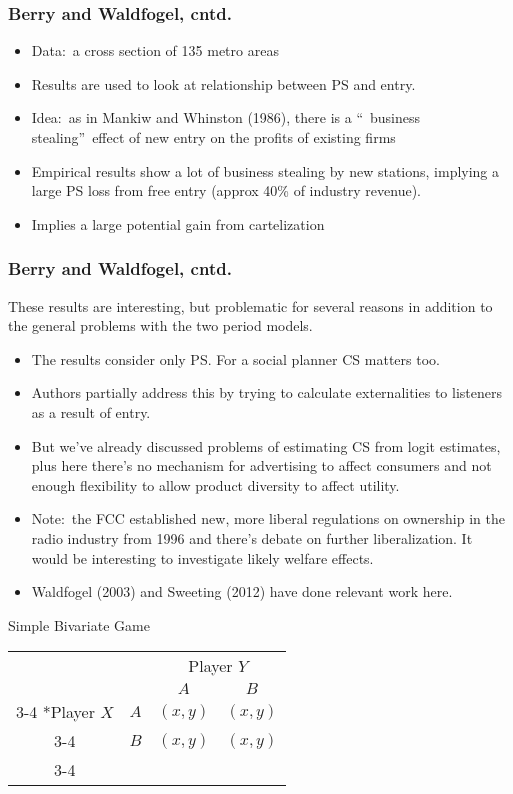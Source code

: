 \begin{frame}
\frametitle{Berry and Waldfogel, cntd.}
\begin{itemize}
\item Data:\ a cross section of 135 metro areas
\item Results are used to look at relationship between PS and entry.
\item Idea:\ as in Mankiw and Whinston (1986), there is a \textquotedblleft\
business stealing\textquotedblright\ effect of new entry on the profits of
existing firms
\item Empirical results show a lot of business stealing by new stations,
implying a large PS loss from free entry (approx 40\% of industry revenue).
\item Implies a large potential gain from cartelization
\end{itemize}
\end{frame}


\begin{frame}
\frametitle{Berry and Waldfogel, cntd.}
These results are interesting, but problematic for several reasons in
addition to the general problems with the two period models.
\begin{itemize}
\item The results consider only PS. For a social planner CS matters too.
\item Authors partially address this by trying to calculate externalities to
listeners as a result of entry.
\item But we've already discussed problems of estimating CS from logit
estimates, plus here there's no mechanism for advertising to affect
consumers and not enough flexibility to allow product diversity to affect
utility.
\item Note:\ the FCC established new, more liberal regulations on ownership
in the radio industry from 1996 and there's debate on further
liberalization. It would be interesting to investigate likely welfare
effects.
\item Waldfogel (2003) and Sweeting (2012) have done relevant work here.
\end{itemize}
\end{frame}

\begin{frame}{Simple Bivariate Game}
  \begin{table}
    \setlength{\extrarowheight}{2pt}
    \begin{tabular}{cc|c|c|}
      & \multicolumn{1}{c}{} & \multicolumn{2}{c}{Player $Y$}\\
      & \multicolumn{1}{c}{} & \multicolumn{1}{c}{$A$}  & \multicolumn{1}{c}{$B$} \\\cline{3-4}
      \multirow{2}*{Player $X$}  & $A$ & $(x,y)$ & $(x,y)$ \\\cline{3-4}
      & $B$ & $(x,y)$ & $(x,y)$ \\\cline{3-4}
    \end{tabular}
  \end{table}

\end{frame}


